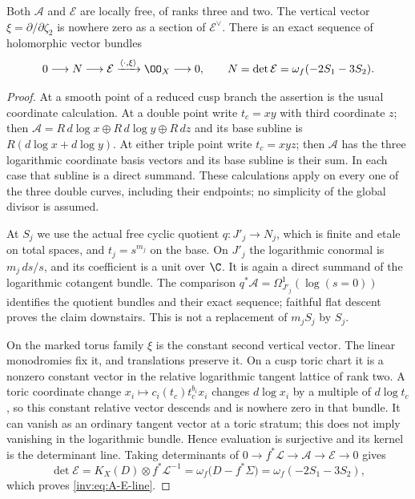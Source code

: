 \begin{proposition}\label{inv:A1.1}
Both $\mathcal A$ and $\mathcal E$ are locally free, of ranks three and
two.  The vertical vector $\xi=\partial/\partial\zeta_2$ is nowhere
zero as a section of $\mathcal E^\vee$.  There is an exact sequence
of holomorphic vector bundles
\begin{equation}\label{inv:eq:A-E-line}
0\longrightarrow N\longrightarrow\mathcal E
 \xrightarrow{\langle\cdot,\xi\rangle}\OO_X\longrightarrow0,
\qquad N=\det\mathcal E=\omega_f(-2S_1-3S_2).
\end{equation}
\end{proposition}

\begin{proof}
At a smooth point of a reduced cusp branch the assertion is the usual
coordinate calculation.  At a double point write $t_c=xy$ with third
coordinate $z$; then
$\mathcal A=R\,d\log x\oplus R\,d\log y\oplus R\,dz$ and its
base subline is $R(d\log x+d\log y)$.  At either triple point write
$t_c=xyz$; then $\mathcal A$ has the three logarithmic coordinate
basis vectors and its base subline is their sum.  In each case that
subline is a direct summand.  These calculations apply on every one
of the three double curves, including their endpoints; no simplicity
of the global divisor is assumed.

At $S_j$ we use the actual free cyclic quotient
$q:J'_j\to N_j$, which is finite and etale on total spaces, and
$t_j=s^{m_j}$ on the base.  On $J'_j$ the logarithmic conormal is
$m_j\,ds/s$, and its coefficient is a unit over $\C$.  It is again a
direct summand of the logarithmic cotangent bundle.  The comparison
$q^*\mathcal A=\Omega_{J'_j}^1(\log(s=0))$ identifies the quotient
bundles and their exact sequence; faithful flat descent proves the
claim downstairs.  This is not a replacement of $m_jS_j$ by $S_j$.

On the marked torus family $\xi$ is the constant second vertical
vector.  The linear monodromies fix it, and translations preserve it.
On a cusp toric chart it is a nonzero constant vector in the relative
logarithmic tangent lattice of rank two.  A toric coordinate change
$x_i\mapsto c_i(t_c)t_c^{b_i}x_i$ changes $d\log x_i$ by a multiple
of $d\log t_c$, so this constant relative vector descends and is
nowhere zero in that bundle.  It can vanish as an ordinary tangent
vector at a toric stratum; this does not imply vanishing in the
logarithmic bundle.  Hence evaluation is surjective and its kernel
is the determinant line.  Taking determinants of
$0\to f^*\mathcal L\to\mathcal A\to\mathcal E\to0$ gives
\[
\det\mathcal E=K_X(D)\otimes f^*\mathcal L^{-1}
=\omega_f\bigl(D-f^*\Sigma\bigr)
=\omega_f(-2S_1-3S_2),
\]
which proves \eqref{inv:eq:A-E-line}.
\end{proof}

